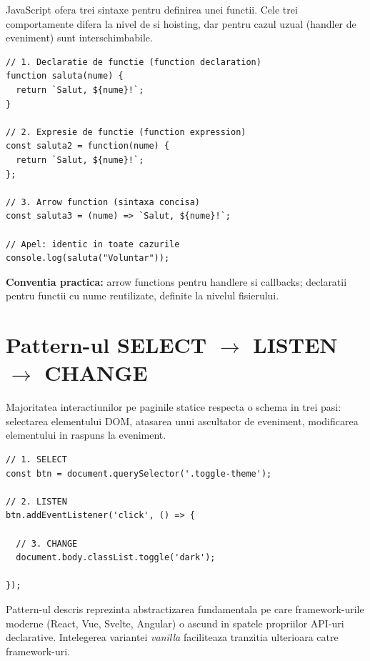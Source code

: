 JavaScript ofera trei sintaxe pentru definirea unei functii. Cele trei comportamente difera la nivel de  si hoisting, dar pentru cazul uzual (handler de eveniment) sunt interschimbabile.

\begin{lstlisting}[style=js, caption={Trei moduri de a scrie aceeasi functie}]
// 1. Declaratie de functie (function declaration)
function saluta(nume) {
  return `Salut, ${nume}!`;
}

// 2. Expresie de functie (function expression)
const saluta2 = function(nume) {
  return `Salut, ${nume}!`;
};

// 3. Arrow function (sintaxa concisa)
const saluta3 = (nume) => `Salut, ${nume}!`;

// Apel: identic in toate cazurile
console.log(saluta("Voluntar"));
\end{lstlisting}

\textbf{Conventia practica:} arrow functions pentru handlere si callbacks; declaratii pentru functii cu nume reutilizate, definite la nivelul fisierului.

\section{Pattern-ul SELECT $\to$ LISTEN $\to$ CHANGE}

Majoritatea interactiunilor pe paginile statice respecta o schema in trei pasi: selectarea elementului DOM, atasarea unui ascultator de eveniment, modificarea elementului in raspuns la eveniment.

\begin{lstlisting}[style=js, caption={Toggle pentru tema dark/light}]
// 1. SELECT
const btn = document.querySelector('.toggle-theme');

// 2. LISTEN
btn.addEventListener('click', () => {

  // 3. CHANGE
  document.body.classList.toggle('dark');

});
\end{lstlisting}

\begin{ponturi}
Pattern-ul descris reprezinta abstractizarea fundamentala pe care framework-urile moderne (React, Vue, Svelte, Angular) o ascund in spatele propriilor API-uri declarative. Intelegerea variantei \emph{vanilla} faciliteaza tranzitia ulterioara catre framework-uri.
\end{ponturi}

